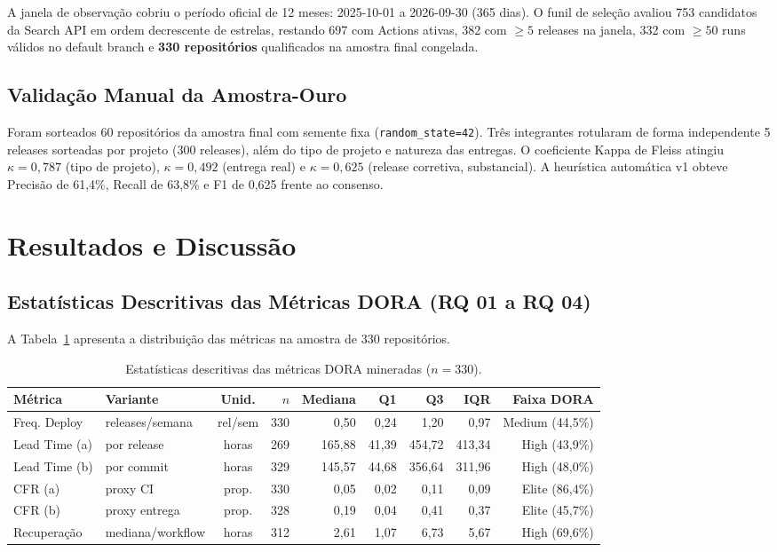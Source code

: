 \documentclass[12pt]{article}
\begin{document}
A janela de observação cobriu o período oficial de 12 meses: 2025-10-01 a 2026-09-30 (365 dias). O funil de seleção avaliou 753 candidatos da Search API em ordem decrescente de estrelas, restando 697 com Actions ativas, 382 com $\ge 5$ releases na janela, 332 com $\ge 50$ runs válidos no default branch e \textbf{330 repositórios} qualificados na amostra final congelada.

\subsection{Validação Manual da Amostra-Ouro}
Foram sorteados 60 repositórios da amostra final com semente fixa (\texttt{random\_state=42}). Três integrantes rotularam de forma independente 5 releases sorteadas por projeto (300 releases), além do tipo de projeto e natureza das entregas. O coeficiente Kappa de Fleiss atingiu $\kappa = 0{,}787$ (tipo de projeto), $\kappa = 0{,}492$ (entrega real) e $\kappa = 0{,}625$ (release corretiva, substancial). A heurística automática v1 obteve Precisão de 61,4\%, Recall de 63,8\% e F1 de 0,625 frente ao consenso.

\section{Resultados e Discussão}

\subsection{Estatísticas Descritivas das Métricas DORA (RQ 01 a RQ 04)}
A Tabela~\ref{tab:metricas_dora} apresenta a distribuição das métricas na amostra de 330 repositórios.

\begin{table}[ht]
\centering
\caption{Estatísticas descritivas das métricas DORA mineradas ($n=330$).}
\label{tab:metricas_dora}
\small
\begin{tabular}{llcrrrrrr}
\toprule
\textbf{Métrica} & \textbf{Variante} & \textbf{Unid.} & \textbf{$n$} & \textbf{Mediana} & \textbf{Q1} & \textbf{Q3} & \textbf{IQR} & \textbf{Faixa DORA} \\
\midrule
Freq. Deploy & releases/semana & rel/sem & 330 & 0,50 & 0,24 & 1,20 & 0,97 & Medium (44,5\%) \\
Lead Time (a) & por release & horas & 269 & 165,88 & 41,39 & 454,72 & 413,34 & High (43,9\%) \\
Lead Time (b) & por commit & horas & 329 & 145,57 & 44,68 & 356,64 & 311,96 & High (48,0\%) \\
CFR (a) & proxy CI & prop. & 330 & 0,05 & 0,02 & 0,11 & 0,09 & Elite (86,4\%) \\
CFR (b) & proxy entrega & prop. & 328 & 0,19 & 0,04 & 0,41 & 0,37 & Elite (45,7\%) \\
Recuperação & mediana/workflow & horas & 312 & 2,61 & 1,07 & 6,73 & 5,67 & High (69,6\%) \\
\bottomrule
\end{tabular}
\end{table}
\end{document}
